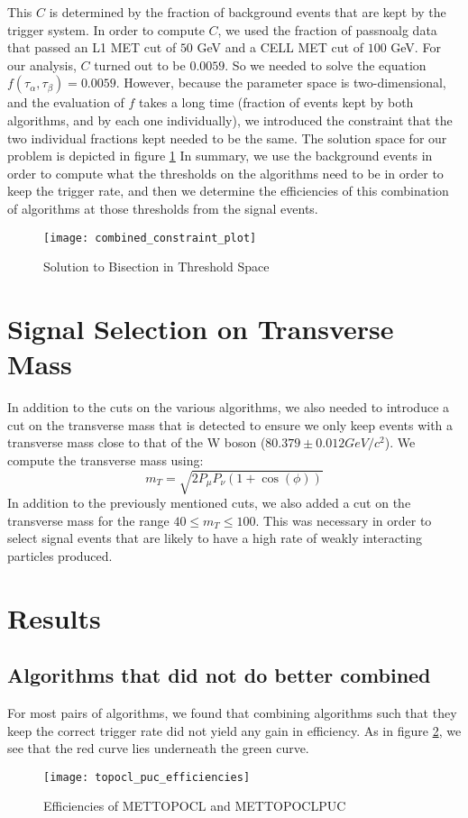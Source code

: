 This $C$ is determined by the fraction of background events that are kept by the trigger system. 
In order to compute $C$, we used the fraction of passnoalg data that passed an L1 MET cut of $50$ GeV and a CELL MET cut of $100$ GeV. 
For our analysis, $C$ turned out to be $0.0059$.
So we needed to solve the equation $f(\tau_{\alpha},\tau_{\beta})=0.0059$. 
However, because the parameter space is two-dimensional, and the evaluation of $f$ takes a long time (fraction of events kept by both algorithms, and by each one individually), we introduced the constraint that the two individual fractions kept needed to be the same. The solution space for our problem is depicted in figure \ref{solution_space}
In summary, we use the background events in order to compute what the thresholds on the algorithms need to be in order to keep the trigger rate, and then we determine the efficiencies of this combination of algorithms at those thresholds from the signal events. 
\begin{figure}[h]
        \centering
        \texttt{[image: combined\_constraint\_plot]}
        \caption{Solution to Bisection in Threshold Space}
        \label{solution_space}
\end{figure} 
\section{Signal Selection on Transverse Mass}
In addition to the cuts on the various algorithms, we also needed to introduce a cut on the transverse mass that is detected to ensure we only keep events with a transverse mass close to that of the W boson ($80.379\pm 0.012 GeV/c^2$). 
We compute the transverse mass using:
$$m_{T}=\sqrt{2P_{\mu}P_{\nu}(1+\cos{(\phi)})}$$
In addition to the previously mentioned cuts, we also added a cut on the transverse mass for the range $40 \leq m_{T} \leq 100$. 
This was necessary in order to select signal events that are likely to have a high rate of weakly interacting particles produced.
\pagebreak
\section{Results}
\subsection{Algorithms that did not do better combined}
For most pairs of algorithms, we found that combining algorithms such that they keep the correct trigger rate did not yield any gain in efficiency. As in figure \ref{no_gain_efficiency}, we see that the red curve lies underneath the green curve. 
\begin{figure}[h]
        \centering
        \texttt{[image: topocl\_puc\_efficiencies]}
        \caption{Efficiencies of METTOPOCL and METTOPOCLPUC}
        \label{no_gain_efficiency}
\end{figure}
\clearpage
